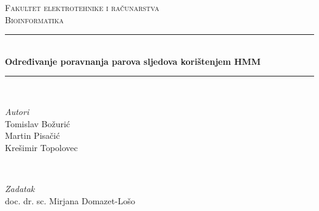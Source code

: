 \documentclass[a4paper]{article}
\begin{document}

\begin{titlepage} %
	\newcommand{\HRule}{\rule{\linewidth}{0.5mm}} %
	
	\center %
	
	
	\textsc{\LARGE Fakultet elektrotehnike i računarstva}\\[1.5cm] %
	
	\textsc{\Large Bioinformatika}\\[0.5cm] %
	
	
	
	
	\HRule\\[0.4cm]
	
	{\huge\bfseries Određivanje poravnanja parova sljedova korištenjem HMM}\\[0.4cm] %
	
	\HRule\\[1.5cm]
	
	
	\begin{minipage}{0.4\textwidth}
		\begin{flushleft}
			\large
			\textit{Autori}\\
			 {Tomislav Božurić}\\
			 {Martin Pisačić}\\
			 {Krešimir Topolovec} %
		\end{flushleft}
	\end{minipage}
	~
	\begin{minipage}{0.4\textwidth}
		\begin{flushright}
			\large
			\textit{Zadatak}\\
			 doc. dr. sc. {Mirjana Domazet-Lošo} %
		\end{flushright}
	\end{minipage}
	

\end{titlepage}
\end{document}

